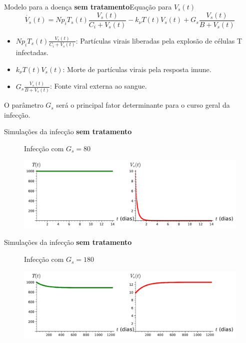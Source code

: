 \documentclass[13pt]{beamer}
\begin{document}
\begin{frame}{Modelo para a doença \textbf{sem tratamento}}{Equação para \( V_{ s } ( t ) \)}
    \begin{equation*}
        \dot{V_{ s }} ( t ) = N p_{ i } T_{ s } ( t ) \frac{ V_{ s } ( t ) }{ C_{ i } + V_{ s } ( t ) } - k_{ \nu } T ( t ) V_{ s } ( t ) + G_{ s } \frac{ V_{ s } ( t ) }{ B + V_{ s } ( t ) } \label{Vsponto_S}
    \end{equation*}
    \begin{itemize}
        \item<2-> \( N p_{ i } T_{ s } ( t ) \frac{ V_{ s } ( t ) }{ C_{ i } + V_{ s } ( t ) } \): Partículas virais liberadas pela explosão de células T infectadas.
        \item<3-> \( k_{ \nu } T ( t ) V_{ s } ( t ) \): Morte de partículas virais pela resposta imune.
        \item<4-> \( G_{ s } \frac{ V_{ s } ( t ) }{ B + V_{ s } ( t ) } \): Fonte viral externa ao sangue.
    \end{itemize}
     {O parâmetro \( G_{ s } \) será o principal fator determinante para o curso geral da infecção.}
\end{frame}

\begin{frame}{Simulações da infecção \textbf{sem tratamento}}
    \begin{figure}[htb]
        Infecção com \( G_{ s } = 80 \)
        \begin{center}
            \includegraphics[width=1\textwidth]{../figuras/cenario_1.pdf}
        \end{center}
    \end{figure}
\end{frame}

\begin{frame}{Simulações da infecção \textbf{sem tratamento}}
    \begin{figure}[htb]
        Infecção com \( G_{ s } = 180 \)
        \begin{center}
            \includegraphics[width=\textwidth]{../figuras/cenario_2.pdf}
        \end{center}
    \end{figure}
\end{frame}
\end{document}
